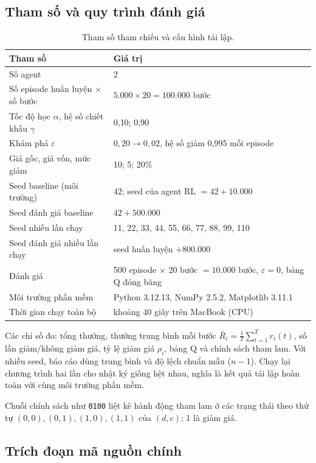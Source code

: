\documentclass[12pt,a4paper]{report}
\begin{document}
\subsection{Tham số và quy trình đánh giá}
\begin{table}[H]
\centering
\small
\caption{Tham số tham chiếu và cấu hình tái lập.}
\label{tab:params}
\begin{tabular}{ll}
\toprule
Tham số & Giá trị \\
\midrule
Số agent & 2 \\
Số episode huấn luyện $\times$ số bước & $5.000\times20=100.000$ bước \\
Tốc độ học $\alpha$, hệ số chiết khấu $\gamma$ & 0{,}10; 0{,}90 \\
Khám phá $\varepsilon$ & $0{,}20\to0{,}02$, hệ số giảm 0{,}995 mỗi episode \\
Giá gốc, giá vốn, mức giảm & 10; 5; 20\% \\
Seed baseline (môi trường) & 42; seed của agent RL $=42+10.000$ \\
Seed đánh giá baseline & $42+500.000$ \\
Seed nhiều lần chạy & 11, 22, 33, 44, 55, 66, 77, 88, 99, 110 \\
Seed đánh giá nhiều lần chạy & seed huấn luyện $+800.000$ \\
Đánh giá & 500 episode $\times$ 20 bước $=10.000$ bước, $\varepsilon=0$, bảng Q đóng băng \\
Môi trường phần mềm & Python 3.12.13, NumPy 2.5.2, Matplotlib 3.11.1 \\
Thời gian chạy toàn bộ & khoảng 40 giây trên MacBook (CPU) \\
\bottomrule
\end{tabular}
\end{table}

Các chỉ số đo: tổng thưởng, thưởng trung bình mỗi bước
$\bar R_i=\frac1T\sum_{t=1}^{T}r_i(t)$, số lần giảm/không giảm giá, tỷ lệ giảm giá
$\rho_i$, bảng Q và chính sách tham lam. Với nhiều seed, báo cáo dùng trung bình và
độ lệch chuẩn mẫu ($n-1$). Chạy lại chương trình hai lần cho nhật ký giống hệt
nhau, nghĩa là kết quả tái lập hoàn toàn với cùng môi trường phần mềm.

Chuỗi chính sách như \texttt{0100} liệt kê hành động tham lam ở các trạng thái
theo thứ tự $(0,0),(0,1),(1,0),(1,1)$ của $(d,c)$; 1 là giảm giá.

\subsection{Trích đoạn mã nguồn chính}
\end{document}
